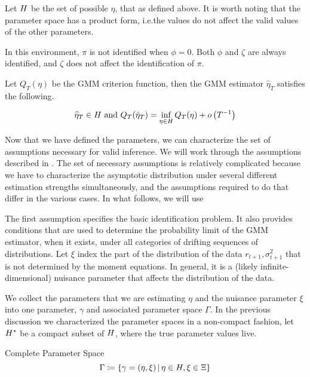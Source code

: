 \documentclass[11pt, letterpaper, twoside, final]{article}
\begin{document}
Let $H$ be the set of possible $\eta$, that as defined above.
It is worth noting that the parameter space has a product form, i.e.\@ the values do not affect the valid values
of the other parameters.

In this environment, $\pi$ is not identified when $\phi = 0$.
Both $\phi$ and $\zeta$ are always identified, and $\zeta$ does not affect the identification of $\pi$.

Let $Q_T(\eta)$ be the GMM criterion function, then the GMM estimator $\hat{\eta}_T$ satisfies the following.


\begin{equation}
    \widehat{\eta}_T \in \Eta\ \text{and}\ Q_T(\hat{\eta}_T) = \inf_{\eta \in \Eta} Q_T(\eta) +
    o\left(T^{-1}\right) 
\end{equation}


Now that we have defined the parameters, we can characterize the set of assumptions necessary for valid inference.
We will work through the assumptions described in \textcite{andrews2014Gmm}.
The set of necessary assumptions is relatively complicated because we have to characterize the asymptotic
distribution under several different estimation strengths simultaneously, and the assumptions required to do that
  differ in the various cases. 
In what follows, we will use 

The first assumption specifies the basic identification
problem. It also provides conditions that are used to determine the
probability limit of the GMM estimator, when it exists, under all categories
of drifting sequences of distributions.
Let $\xi$ index the part of the distribution of the data $r_{t+1}, \sigma^2_{t+1}$ that is not determined by the
moment equations.
In general, it is a (likely infinite-dimensional) nuisance parameter that affects the distribution of the data. 


We collect the parameters that we are estimating $\eta$ and the nuisance parameter $\xi$ into one parameter,
$\gamma$ and associated parameter space $\Gamma$.
In the previous discussion we characterized the parameter spaces in a non-compact fashion, let $H^{*}$ be a
compact subset of $H$, where the true parameter values live.

\begin{defn}{Complete Parameter Space}
    \begin{equation}
        \Gamma \coloneqq \left\lbrace \gamma = (\eta, \xi) \,\middle\vert\, \eta \in H, \xi \in \Xi \right\rbrace 
    \end{equation}
\end{defn}
\end{document}
